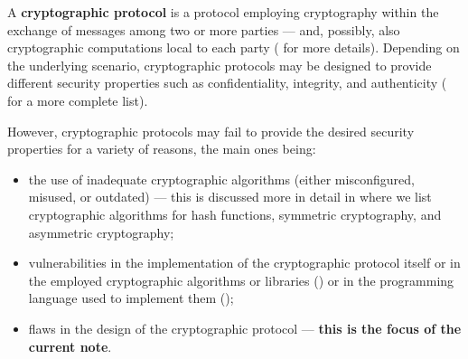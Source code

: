 A \textbf{cryptographic protocol} is a protocol employing cryptography within the exchange of messages among two or more parties --- and, possibly, also cryptographic computations local to each party ( for more details). Depending on the underlying scenario, cryptographic protocols may be designed to provide different security properties such as confidentiality, integrity, and authenticity ( for a more complete list).

However, cryptographic protocols may fail to provide the desired security properties for a variety of reasons, the main ones being:
\begin{itemize}
	\item the use of inadequate cryptographic algorithms (either misconfigured, misused, or outdated) --- this is discussed more in detail in  where we list cryptographic algorithms for hash functions, symmetric cryptography, and asymmetric cryptography;
	\item vulnerabilities in the implementation of the cryptographic protocol itself or in the employed cryptographic algorithms or libraries () or in the programming language used to implement them ();
	\item flaws in the design of the cryptographic protocol --- \textbf{this is the focus of the current note}.
\end{itemize}
